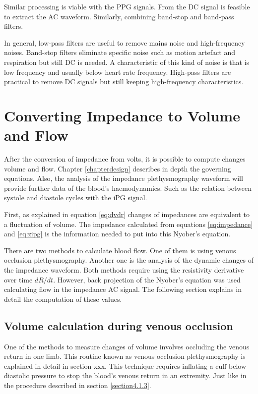Similar processing is viable with the PPG signals. From the DC signal is feasible to extract the AC waveform. Similarly, combining band-stop and band-pass filters.

In general, low-pass filters are useful to remove mains noise and high-frequency noises. Band-stop filters eliminate specific noise such as motion artefact and respiration but still DC is needed. A characteristic of this kind of noise is that is low frequency and usually below heart rate frequency. High-pass filters are practical to remove DC signals but still keeping high-frequency characteristics.


\section{Converting Impedance to Volume and Flow}
\label{section4.3}

After the conversion of impedance from volts, it is possible to compute changes volume and flow. Chapter \ref{chapterdesign} describes in depth the governing equations. Also, the analysis of the impedance plethysmography waveform will provide further data of the blood's haemodynamics. Such as the relation between systole and diastole cycles with the iPG signal.

First, as explained in equation \ref{eq:dvdr} changes of impedances are equivalent to a fluctuation of volume.  The impedance calculated from equations \ref{eq:impedance} and \ref{eq:zipg} is the information needed to put into this Nyober's equation.

There are two methods to calculate blood flow. One of them is using venous occlusion plethysmography. Another one is the analysis of the dynamic changes of the impedance waveform. Both methods require using the resistivity derivative over time $dR/dt$. However, back projection of the Nyober's equation was used calculating flow in the impedance AC signal. The following section explains in detail the computation of these values.  


\subsection{Volume calculation during venous occlusion}
\label{section.4.3.1}
One of the methods to measure changes of volume involves occluding the venous return in one limb. This routine known as venous occlusion plethysmography is explained in detail in section xxx. This technique requires inflating a cuff below diastolic pressure to stop the blood's venous return in an extremity. Just like in the procedure described in section \ref{section4.1.3}. 

